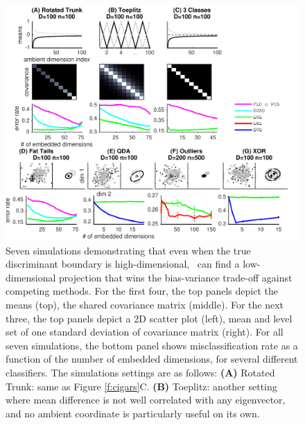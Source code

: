 \documentclass[10pt]{article}
\begin{document}
%





\begin{figure}[h!]
\centering
\includegraphics[width=1\linewidth]{../Figs/properties}
\caption{
Seven simulations demonstrating that even when the true discriminant boundary is high-dimensional, \Lol~can find a low-dimensional projection that wins the bias-variance trade-off against competing methods.
For the first four, the top panels depict the means (top), the shared covariance matrix (middle).  For the next three, the top panels depict a 2D scatter plot (left), mean and level set of one standard deviation of covariance matrix (right).  For all seven simulations, the bottom panel shows misclassification rate as a function of the number of embedded dimensions, for several different classifiers.  The simulations settings are as follows:
\textbf{(A)} Rotated Trunk: same as Figure \ref{f:cigars}C.
\textbf{(B)} Toeplitz: another setting where mean difference is not well correlated with any eigenvector, and no ambient coordinate is particularly useful on its own.
}
\end{figure}
\end{document}
